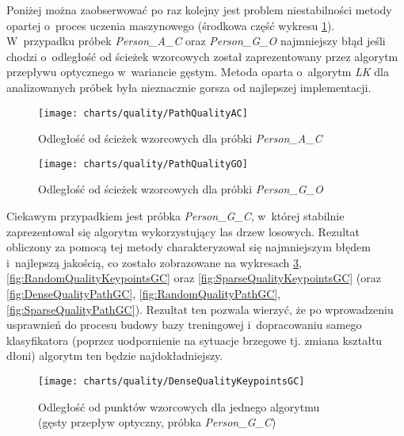     Poniżej można zaobserwować po raz kolejny jest problem niestabilności metody opartej o~proces uczenia maszynowego (środkowa część wykresu \ref{fig:PathQualityAC}). W~przypadku próbek \textit{Person\_A\_C} oraz \textit{Person\_G\_O} najmniejszy błąd jeśli chodzi o~odległość od ścieżek wzorcowych został zaprezentowany przez algorytm przepływu optycznego w~wariancie gęstym. Metoda oparta o~algorytm \textit{LK} dla analizowanych próbek była nieznacznie gorsza od najlepszej implementacji.

    \newpage
      \begin{figure}[!ht]
        \centering
        \texttt{[image: charts/quality/PathQualityAC]}
        \caption[Odległość od ścieżek wzorcowych (próbka osoby A, gest C)]
                {Odległość od ścieżek wzorcowych dla próbki \textit{Person\_A\_C}}
        \label{fig:PathQualityAC}
      \end{figure}

      \begin{figure}[!ht]
        \centering
        \texttt{[image: charts/quality/PathQualityGO]}
        \caption[Odległość od ścieżek wzorcowych (próbka osoby G, gest O)]
                {Odległość od ścieżek wzorcowych dla próbki \textit{Person\_G\_O}}
        \label{fig:PathQualityGO}
      \end{figure}

    Ciekawym przypadkiem jest próbka \textit{Person\_G\_C}, w~której stabilnie zaprezentował się algorytm wykorzystujący las drzew losowych. Rezultat obliczony za pomocą tej metody charakteryzował się najmniejszym błędem i~najlepszą jakością, co zostało zobrazowane na wykresach \ref{fig:DenseQualityKeypointsGC}, \ref{fig:RandomQualityKeypointsGC} oraz \ref{fig:SparseQualityKeypointsGC} (oraz \ref{fig:DenseQualityPathGC}, \ref{fig:RandomQualityPathGC}, \ref{fig:SparseQualityPathGC}). Rezultat ten pozwala wierzyć, że po wprowadzeniu usprawnień do procesu budowy bazy treningowej i~dopracowaniu samego klasyfikatora (poprzez uodpornienie na sytuacje brzegowe tj. zmiana kształtu dłoni) algorytm ten będzie najdokładniejszy.

    \newpage
      \begin{figure}[!ht]
        \centering
        \texttt{[image: charts/quality/DenseQualityKeypointsGC]}
        \caption[Odległość od punktów wzorcowych dla jednego algorytmu (gęsty przepływ optyczny, osoba G, gest C)]
                {Odległość od punktów wzorcowych dla jednego algorytmu\\(gęsty przepływ optyczny, próbka \textit{Person\_G\_C})}
        \label{fig:DenseQualityKeypointsGC}
      \end{figure}

